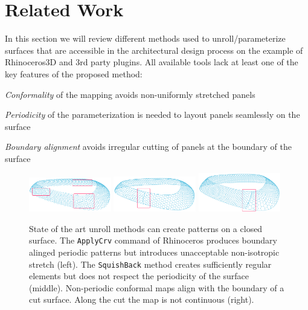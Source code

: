 \documentclass[article.tex]{subfiles}
\begin{document}
\section{Related Work}
\label{sec:parameterization}

In this section we will review different methods used to
unroll/parameterize surfaces that are accessible in the architectural
design process on the example of Rhinoceros3D and 3rd party
plugins. All available tools lack at least one of the key features of
the proposed method:
\smallskip
\begin{compactitem}
\item \emph{Conformality} of the mapping avoids non-uniformly stretched
  panels
\item \emph{Periodicity} of the parameterization is needed to layout
  panels seamlessly on the surface
\item \emph{Boundary alignment} avoids irregular cutting of panels 
at the boundary of the surface  
\end{compactitem}

\begin{figure}[tb]
\centering
\includegraphics[width=0.32\textwidth]{images/failure-uv-marked.png}
\includegraphics[width=0.32\textwidth]{images/failure-squish-marked.png}
\includegraphics[width=0.32\textwidth]{images/failure-rectangle-marked.png}
\caption{State of the art unroll methods can create patterns on a
  closed surface.  The {\tt ApplyCrv} command of Rhinoceros produces
  boundary alinged periodic patterns but introduces unacceptable
  non-isotropic stretch (left). The {\tt SquishBack} method creates
  sufficiently regular elements but does not respect the periodicity
  of the surface (middle).  Non-periodic conformal maps align with the
  boundary of a cut surface. Along the cut the map is not continuous
  (right).}
\label{fig:failure}
\end{figure}
\end{document}
